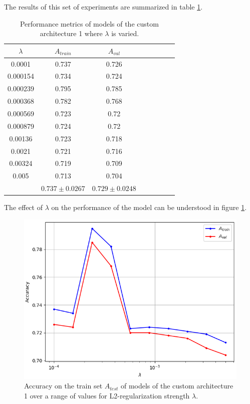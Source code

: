 The results of this set of experiments are summarized in table \ref{table:custom1_all}.

\begin{table}[ht]
\centering
\begin{tabular}{ |c|c|c|c|c|c|c|c| }
\hline
$\lambda$ & $A_{train}$ & $A_{val}$ \\
\hline
0.0001 & 0.737 & 0.726 \\
0.000154 & 0.734 & 0.724 \\
0.000239 & 0.795 & 0.785 \\
0.000368 & 0.782 & 0.768 \\
0.000569 & 0.723 & 0.72 \\
0.000879 & 0.724 & 0.72 \\
0.00136 & 0.723 & 0.718 \\
0.0021 & 0.721 & 0.716 \\
0.00324 & 0.719 & 0.709 \\
0.005 & 0.713 & 0.704 \\
\hline
 & $0.737\pm0.0267$ & $0.729\pm0.0248$ \\
\hline
\end{tabular}
\caption{Performance metrics of models of the custom architecture 1 where $\lambda$ is varied.}
\label{table:custom1_all}
\end{table}

The effect of $\lambda$ on the performance of the model can be understood in figure \ref{fig:custom1_lambda}.

\begin{figure}[ht]
    \centering
    \includegraphics[width=1.0\textwidth]{figs/custom1_lambda.png}
    \caption{Accuracy on the train set $A_{test}$ of models of the custom architecture 1 over a range of values for L2-regularization strength $\lambda$.}
    \label{fig:custom1_lambda}
\end{figure}

